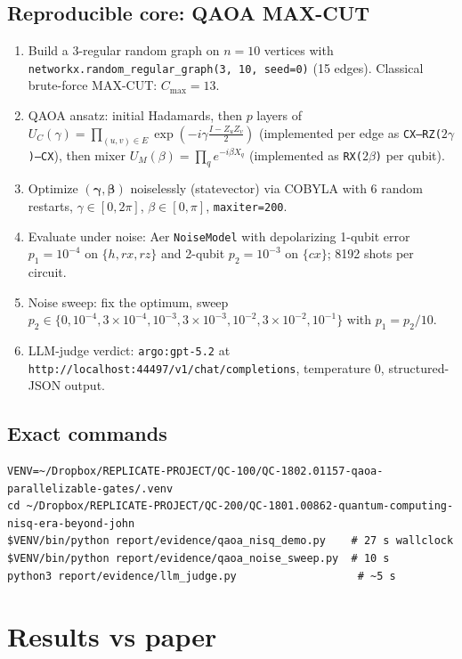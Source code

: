 \documentclass[11pt]{article}
\begin{document}
\subsection{Reproducible core: QAOA MAX-CUT}
\begin{enumerate}
\item Build a 3-regular random graph on $n = 10$ vertices with
      \texttt{networkx.random\_regular\_graph(3, 10, seed=0)} (15 edges).
      Classical brute-force MAX-CUT: $C_{\max} = 13$.
\item QAOA ansatz: initial Hadamards, then $p$ layers of
      $U_C(\gamma) = \prod_{(u,v)\in E} \exp(-i\gamma \frac{I - Z_u Z_v}{2})$
      (implemented per edge as \texttt{CX--RZ($2\gamma$)--CX}), then mixer
      $U_M(\beta) = \prod_q e^{-i\beta X_q}$ (implemented as \texttt{RX($2\beta$)} per qubit).
\item Optimize $(\bm\gamma, \bm\beta)$ noiselessly (statevector) via COBYLA
      with 6 random restarts, $\gamma \in [0, 2\pi]$, $\beta \in [0, \pi]$,
      \texttt{maxiter=200}.
\item Evaluate under noise: Aer \texttt{NoiseModel} with depolarizing
      1-qubit error $p_1 = 10^{-4}$ on $\{h, rx, rz\}$ and 2-qubit
      $p_2 = 10^{-3}$ on $\{cx\}$; 8192 shots per circuit.
\item Noise sweep: fix the optimum, sweep
      $p_2 \in \{0, 10^{-4}, 3\!\times\!10^{-4}, 10^{-3}, 3\!\times\!10^{-3},
                10^{-2}, 3\!\times\!10^{-2}, 10^{-1}\}$ with $p_1 = p_2/10$.
\item LLM-judge verdict: \texttt{argo:gpt-5.2} at
      \texttt{http://localhost:44497/v1/chat/completions}, temperature 0,
      structured-JSON output.
\end{enumerate}

\subsection{Exact commands}
\begin{lstlisting}
VENV=~/Dropbox/REPLICATE-PROJECT/QC-100/QC-1802.01157-qaoa-parallelizable-gates/.venv
cd ~/Dropbox/REPLICATE-PROJECT/QC-200/QC-1801.00862-quantum-computing-nisq-era-beyond-john
$VENV/bin/python report/evidence/qaoa_nisq_demo.py    # 27 s wallclock
$VENV/bin/python report/evidence/qaoa_noise_sweep.py  # 10 s
python3 report/evidence/llm_judge.py                   # ~5 s
\end{lstlisting}

\section{Results vs paper}
\end{document}
